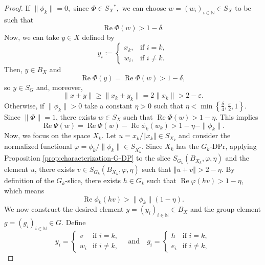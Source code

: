 \documentclass[a4paper,12pt]{amsart}
\theoremstyle{definition}
\theoremstyle{definition}
\theoremstyle{remark}
\numberwithin{equation}{section}
\newcommand{\N}{\mathbb{N}}
\DeclareMathOperator{\re}{Re}
\renewcommand{\geq}{\geqslant}
\newcommand{\<}{\langle}
\renewcommand{\>}{\rangle}
\newcommand{\norm}[1]{\left\Vert#1\right\Vert}
\newcommand{\e}{\varepsilon}
\newcommand{\eps}{\e}
\begin{document}
\begin{proof}
		If $\|\phi_k\|=0,$ since $\Phi\in S_X{^*},$ we can choose $w=(w_i)_{i\in \N}\in S_X$ to be such that
		\begin{equation*}
			\re \Phi(w)>1-\delta.
		\end{equation*}
		Now, we can take $y\in X$ defined by 
		\begin{equation*}
			y_i := \begin{cases} 
				x_k, & \text{if } i = k, \\ 
				w_i, & \text{if } i \neq k. 
			\end{cases}
		\end{equation*}
		Then, $y\in B_X$ and 
		\begin{equation*}
			\re \Phi(y)=\re \Phi(w)>1-\delta,
		\end{equation*}
		so $y\in S_G$ and, moreover,
		\begin{equation*}
			\|x+y\|\geq\|x_k+y_k\|=2\|x_k\|>2-\eps.
		\end{equation*}
		Otherwise, if $\|\phi_k\|>0$ take a constant $\eta > 0$  such that $\eta < \min\left\{\frac{\delta}{4}, \frac{\e}{2}, 1\right\}$.
		Since $\|\Phi\|=1$, there exists $w \in S_X$ such that $\re \Phi(w) > 1 - \eta$. This implies
		\begin{equation} \label{eq:psi_estimate}
			\re \Psi(w) = \re \Phi(w) - \re \phi_k(w_k) > 1 - \eta - \|\phi_k\|.
		\end{equation}
		Now, we focus on the space $X_k$. Let $u = x_k / \norm{x_k} \in S_{X_k}$ and consider the normalized functional $\varphi = \phi_k / \|\phi_k\| \in S_{X_k^*}$. Since $X_k$ has the $G_k$-DPr, applying Proposition \ref{prop:characterization-G-DP} to the slice $S_{G_k}(B_{X_k}, \varphi, \eta)$ and the element $u$, there exists $v \in S_{G_k}(B_{X_k}, \varphi, \eta)$ such that $\norm{u+v} > 2 - \eta$.
		By definition of the $G_k$-slice, there exists $h \in G_k$ such that $\re \varphi(hv) > 1 - \eta$, which means
		\begin{equation} \label{eq:phi_estimate}
			\re \phi_k(hv) > \|\phi_k\|(1-\eta).
		\end{equation}
		We now construct the desired element $y = (y_i)_{i \in \N} \in B_X$ and the group element $g = (g_i)_{i \in \N} \in G$. Define
		\begin{equation*}
			y_i = \begin{cases} v & \text{if } i = k, \\ w_i & \text{if } i \neq k, \end{cases}
			\quad \text{and} \quad
			g_i = \begin{cases} h & \text{if } i = k, \\ e_i & \text{if } i \neq k, \end{cases}

\end{equation*}
\end{proof}
\end{document}
